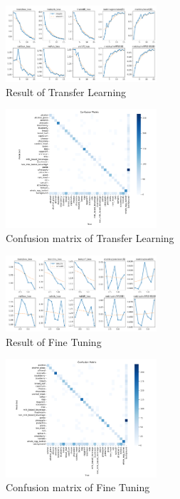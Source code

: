 \documentclass[10pt,twocolumn,letterpaper]{article}
\begin{document}
\begin{figure}[htbp]
    \centering
    \includegraphics[width=0.5\textwidth]{4471_transfer_learning.png}
    \caption{Result of Transfer Learning}
\end{figure}
\begin{figure}[htbp]
    \centering
    \includegraphics[width=0.5\textwidth]{4471_transfer_confusion.png}
    \caption{Confusion matrix of Transfer Learning}
\end{figure}
\begin{figure}[htbp]
    \centering
    \includegraphics[width=0.5\textwidth]{4471_fine_tuning.png}
    \caption{Result of Fine Tuning}
\end{figure}
\begin{figure}[htbp]
    \centering
    \includegraphics[width=0.5\textwidth]{4471_finetuning_confusion.png}
    \caption{Confusion matrix of Fine Tuning}
\end{figure}
\end{document}
